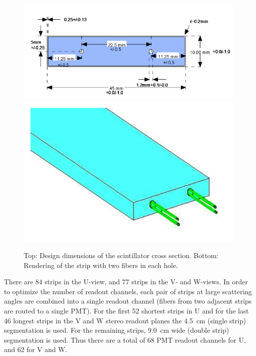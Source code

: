 \begin{figure}[hbt]
\centering
\includegraphics[width=1.05\columnwidth,keepaspectratio]{img/S3_4a.png}
\includegraphics[width=0.75\columnwidth,keepaspectratio]{img/S3_4b.png}
\caption[PCAL UVW Layers]{Top: Design dimensions of the scintillator cross section. Bottom: Rendering of the
  strip with two fibers in each hole.}
\label{fig:S3_4}
\end{figure}

There are $84$ strips in the U-view, and $77$ strips in the V- and W-views. In order to optimize the number of
readout channels, each pair of strips at large scattering angles are combined into a single readout channel (fibers
from two adjacent strips are routed to a single PMT). For the first 52 shortest strips in U and for the last 46
longest strips in the V and W stereo readout planes the 4.5~cm (single strip) segmentation is used. For the
remaining strips, 9.0~cm wide (double strip) segmentation is used. Thus there are a total of 68 PMT readout
channels for U, and 62 for V and W.

